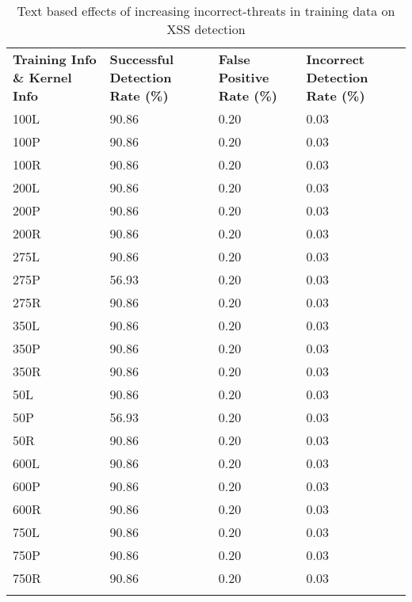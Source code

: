 \begin{appendices}
\begin{longtable}{|p{1.5in}|p{1in}|p{1in}|p{1in}|}
	\hline
	\textbf{Training Info \& Kernel Info} & \textbf{Successful Detection Rate (\%)} & \textbf{False Positive Rate (\%)} & \textbf{Incorrect Detection Rate (\%)}  \\
	\hhline{|=|=|=|=|}
 	100L & 90.86 & 0.20 & 0.03 \\ \hline
 	100P & 90.86 & 0.20 & 0.03 \\ \hline
 	100R & 90.86 & 0.20 & 0.03 \\ \hline
 	200L & 90.86 & 0.20 & 0.03 \\ \hline
 	200P & 90.86 & 0.20 & 0.03 \\ \hline
 	200R & 90.86 & 0.20 & 0.03 \\ \hline
 	275L & 90.86 & 0.20 & 0.03 \\ \hline
 	275P & 56.93 & 0.20 & 0.03 \\ \hline
 	275R & 90.86 & 0.20 & 0.03 \\ \hline
 	350L & 90.86 & 0.20 & 0.03 \\ \hline
 	350P & 90.86 & 0.20 & 0.03 \\ \hline
 	350R & 90.86 & 0.20 & 0.03 \\ \hline
  	50L & 90.86 & 0.20 & 0.03 \\ \hline
  	50P & 56.93 & 0.20 & 0.03 \\ \hline
  	50R & 90.86 & 0.20 & 0.03 \\ \hline
 	600L & 90.86 & 0.20 & 0.03 \\ \hline
 	600P & 90.86 & 0.20 & 0.03 \\ \hline
 	600R & 90.86 & 0.20 & 0.03 \\ \hline
 	750L & 90.86 & 0.20 & 0.03 \\ \hline
 	750P & 90.86 & 0.20 & 0.03 \\ \hline
 	750R & 90.86 & 0.20 & 0.03 \\ \hline
 	\caption[]{Text based effects of increasing incorrect-threats in training data on XSS detection}
	\label{app:xssIncorrectThreatText}
\end{longtable}


\end{appendices}
